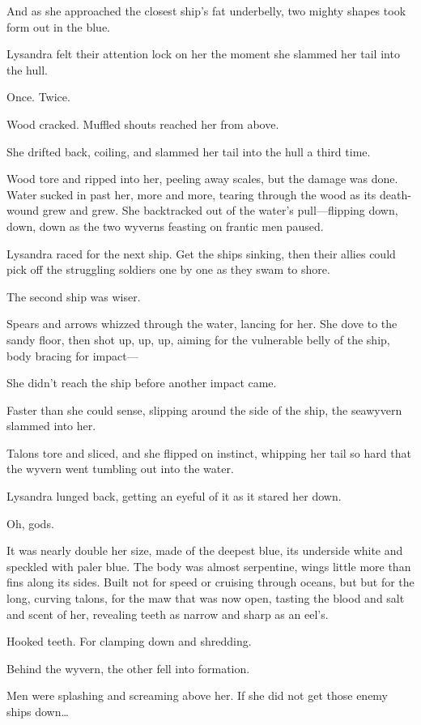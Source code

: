 And as she approached the closest ship's fat underbelly, two mighty shapes took form out in the blue.

Lysandra felt their attention lock on her the moment she slammed her tail into the hull.

Once. Twice.

Wood cracked. Muffled shouts reached her from above.

She drifted back, coiling, and slammed her tail into the hull a third time.

Wood tore and ripped into her, peeling away scales, but the damage was done. Water sucked in past her, more and more, tearing through the wood as its death-wound grew and grew. She backtracked out of the water's pull---flipping down, down, down as the two wyverns feasting on frantic men paused.

Lysandra raced for the next ship. Get the ships sinking, then their allies could pick off the struggling soldiers one by one as they swam to shore.

The second ship was wiser.

Spears and arrows whizzed through the water, lancing for her. She dove to the sandy floor, then shot up, up, up, aiming for the vulnerable belly of the ship, body bracing for impact---

She didn't reach the ship before another impact came.

Faster than she could sense, slipping around the side of the ship, the seawyvern slammed into her.

Talons tore and sliced, and she flipped on instinct, whipping her tail so hard that the wyvern went tumbling out into the water.

Lysandra lunged back, getting an eyeful of it as it stared her down.

Oh, gods.

It was nearly double her size, made of the deepest blue, its underside white and speckled with paler blue. The body was almost serpentine, wings little more than fins along its sides. Built not for speed or cruising through oceans, but  but for the long, curving talons, for the maw that was now open, tasting the blood and salt and scent of her, revealing teeth as narrow and sharp as an eel's.

Hooked teeth. For clamping down and shredding.

Behind the wyvern, the other fell into formation.

Men were splashing and screaming above her. If she did not get those enemy ships down\ldots{}

